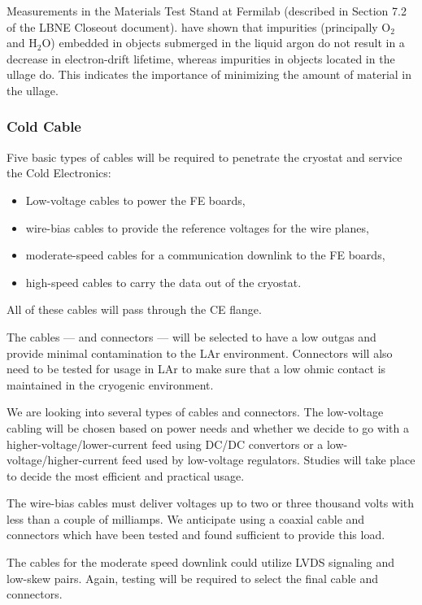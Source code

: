 Measurements in the Materials Test Stand at Fermilab (described in Section 7.2 of the LBNE Closeout document).
have shown that impurities (principally O$_2$ and H$_2$O) embedded in objects submerged in the liquid argon do not result
in a decrease in electron-drift lifetime, whereas impurities in objects located in the ullage do.
This indicates the importance of minimizing the amount of material in the ullage.

%
\subsubsection{Cold Cable}
\label{subsubsec:ce_feedthrough_cable}

Five basic types of cables will be required to penetrate the cryostat and service the Cold Electronics:
\begin{itemize}
\item Low-voltage cables to power the FE boards,
\item wire-bias cables to provide the reference voltages for the wire planes,
\item moderate-speed cables for a communication downlink to the FE boards,
\item high-speed cables to carry the data out of the cryostat.
\end{itemize}
All of these cables will pass through the CE flange.

The cables --- and connectors --- will be selected to have a low outgas and provide minimal contamination to the LAr environment.
Connectors will also need to be tested for usage in LAr to make sure that a low ohmic contact is maintained
in the cryogenic environment.

We are looking into several types of cables and connectors.
The low-voltage cabling will be %
chosen based on power needs and whether we decide to go with a higher-voltage/lower-current
feed using DC/DC convertors or a low-voltage/higher-current feed used by low-voltage regulators.
Studies will take place to decide the most efficient and practical usage.

The wire-bias cables must deliver voltages up to %
two or three thousand volts with less than a couple of milliamps.
We anticipate using a coaxial cable and connectors which have been tested and found sufficient to provide this load.

The cables for the moderate speed downlink could utilize LVDS signaling and low-skew pairs.
Again, testing will be required to select the final cable and connectors.


